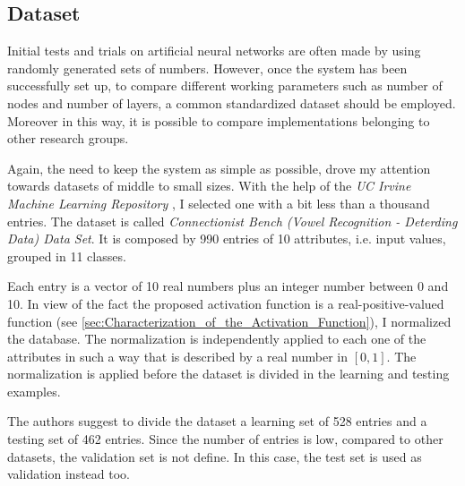 \subsection{Dataset}
\label{ssec:PyDataset}
Initial tests and trials on artificial neural networks are often made by using randomly generated sets of numbers.
However, once the system has been successfully set up, to compare different working parameters such as number of nodes and number of layers, a common standardized dataset should be employed.
Moreover in this way, it is possible to compare implementations belonging to other research groups.

Again, the need to keep the system as simple as possible, drove my attention towards datasets of middle to small sizes.
With the help of the \textit{UC Irvine Machine Learning Repository} \cite{UCIMLR}, I selected one with a bit less than a thousand entries.
The dataset is called \textit{Connectionist Bench (Vowel Recognition - Deterding Data) Data Set}.
It is composed by \num{990} entries of \num{10} attributes, i.e. input values, grouped in \num{11} classes.

Each entry is a vector of \num{10} real numbers plus an integer number between \num{0} and \num{10}.
In view of the fact the proposed activation function is a real-positive-valued function (see \autoref{sec:Characterization_of_the_Activation_Function}), I normalized the database.
The normalization is independently applied to each one of the attributes in such a way that is described by a real number in $[0,1]$.
The normalization is applied before the dataset is divided in the learning and testing examples.

The authors suggest to divide the dataset a learning set of \num{528} entries and a testing set of \num{462} entries.
Since the number of entries is low, compared to other datasets, the validation set is not define.
In this case, the test set is used as validation instead too.

